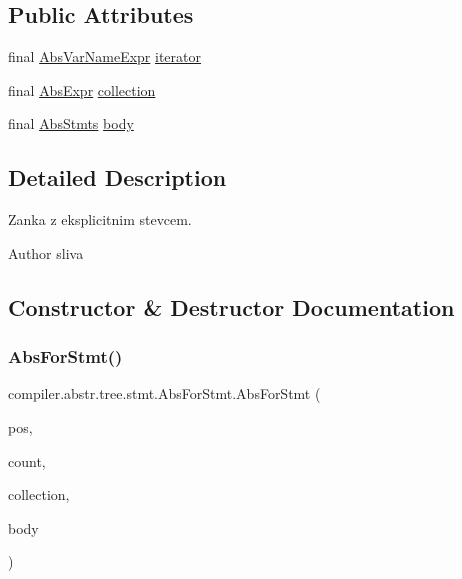 \subsection*{Public Attributes}
\begin{DoxyCompactItemize}
\item 
final \hyperlink{classcompiler_1_1abstr_1_1tree_1_1expr_1_1_abs_var_name_expr}{Abs\+Var\+Name\+Expr} \hyperlink{classcompiler_1_1abstr_1_1tree_1_1stmt_1_1_abs_for_stmt_a9a221b4668b47fe9a3dd1d223e5ff914}{iterator}
\item 
final \hyperlink{classcompiler_1_1abstr_1_1tree_1_1expr_1_1_abs_expr}{Abs\+Expr} \hyperlink{classcompiler_1_1abstr_1_1tree_1_1stmt_1_1_abs_for_stmt_a6c0ef8f42c7d6a2d739814a133452210}{collection}
\item 
final \hyperlink{classcompiler_1_1abstr_1_1tree_1_1_abs_stmts}{Abs\+Stmts} \hyperlink{classcompiler_1_1abstr_1_1tree_1_1stmt_1_1_abs_for_stmt_a228fc9e4d2dd55f25818aeca387bd43b}{body}
\end{DoxyCompactItemize}


\subsection{Detailed Description}
Zanka z eksplicitnim stevcem.

\begin{DoxyAuthor}{Author}
sliva 
\end{DoxyAuthor}


\subsection{Constructor \& Destructor Documentation}
\mbox{\label{classcompiler_1_1abstr_1_1tree_1_1stmt_1_1_abs_for_stmt_a0a52924276f516888867543319ed037a}} 
\subsubsection{\texorpdfstring{Abs\+For\+Stmt()}{AbsForStmt()}}
{\footnotesize\ttfamily compiler.\+abstr.\+tree.\+stmt.\+Abs\+For\+Stmt.\+Abs\+For\+Stmt (\begin{DoxyParamCaption}\item[{\hyperlink{classcompiler_1_1_position}{Position}}]{pos,  }\item[{\hyperlink{classcompiler_1_1abstr_1_1tree_1_1expr_1_1_abs_var_name_expr}{Abs\+Var\+Name\+Expr}}]{count,  }\item[{\hyperlink{classcompiler_1_1abstr_1_1tree_1_1expr_1_1_abs_expr}{Abs\+Expr}}]{collection,  }\item[{\hyperlink{classcompiler_1_1abstr_1_1tree_1_1_abs_stmts}{Abs\+Stmts}}]{body }\end{DoxyParamCaption})}

